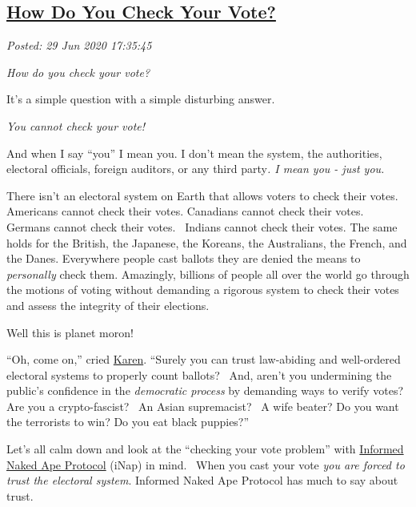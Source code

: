 %

\subsection*{\href{https://analyzethedatanotthedrivel.org/2020/06/29/how-do-you-check-your-vote/}{How Do You Check Your Vote?}}


\noindent\emph{Posted: 29 Jun 2020 17:35:45}
\vspace{6pt}

\emph{How do you check your vote?}

It's a simple question with a simple disturbing answer.

\emph{You cannot check your vote!}

And when I say ``you'' I mean you. I don't mean the system, the
authorities, electoral officials, foreign auditors, or any third
party\emph{. I mean you - just you.}

There isn't an electoral system on Earth that allows voters to check
their votes. Americans cannot check their votes. Canadians cannot check
their votes. Germans cannot check their votes. ~Indians cannot check
their votes. The same holds for the British, the Japanese, the Koreans,
the Australians, the French, and the Danes. Everywhere people cast
ballots they are denied the means to \emph{personally} check them.
Amazingly, billions of people all over the world go through the motions
of voting without demanding a rigorous system to check their votes and
assess the integrity of their elections.

Well this is planet moron!

``Oh, come on,'' cried
\href{https://www.dictionary.com/e/slang/karen/}{Karen}. ``Surely you
can trust law-abiding and well-ordered electoral systems to properly
count ballots? ~And, aren't you undermining the public's confidence in
the \emph{democratic process} by demanding ways to verify votes? Are you
a crypto-fascist?~ An Asian supremacist?~ A wife beater? Do you want the
terrorists to win? Do you eat black puppies?''

Let's all calm down and look at the ``checking your vote problem'' with
\href{https://analyzethedatanotthedrivel.org/2018/05/08/informed-naked-ape-protocol/}{Informed
Naked Ape Protocol} (iNap) in mind.~ When you cast your vote \emph{you
are forced to trust the electoral system}. Informed Naked Ape Protocol
has much to say about trust.

